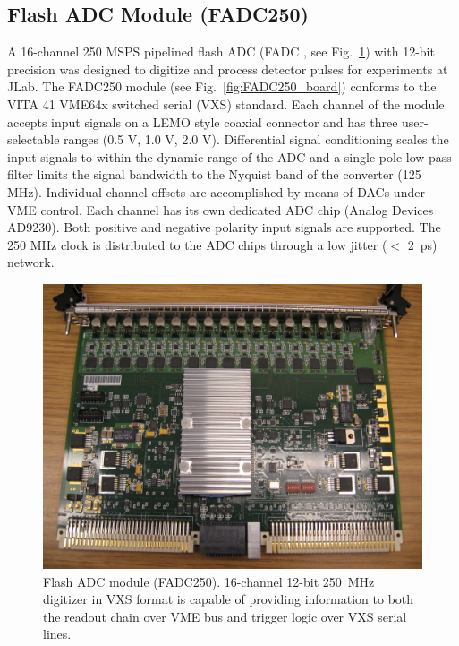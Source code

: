 \subsection{Flash ADC Module (FADC250)}

A 16-channel 250 MSPS pipelined flash ADC (FADC \cite{fadc-ref}, see Fig.~\ref{fig:FADC250pic}) with 12-bit precision was designed to digitize and process detector pulses for experiments at JLab.  The FADC250 module (see Fig.~\ref{fig:FADC250_board}) conforms to the VITA 41 VME64x switched serial (VXS) standard.  Each channel of the module accepts input signals on a LEMO style coaxial connector and has three user-selectable ranges (0.5 V, 1.0 V, 2.0 V).  Differential signal conditioning scales the input signals to within the dynamic range of the ADC and a single-pole low pass filter limits the signal bandwidth to the Nyquist band of the converter (125 MHz). Individual channel offsets are accomplished by means of DACs under VME control.  Each channel has its own dedicated ADC chip (Analog Devices AD9230). Both positive and negative polarity input signals are supported. The 250 MHz clock is distributed to the ADC chips through a low jitter ($<$ 2~ps) network.  

\begin{figure}[hbt]
	\centering
	\includegraphics[width=1.0\columnwidth,keepaspectratio]{img/FADC250pic.jpg}
	\caption{Flash ADC module (FADC250). 16-channel 12-bit 250~MHz digitizer in VXS format is capable of providing information to both the readout chain over VME bus and trigger logic over VXS serial lines.}
	\label{fig:FADC250pic}
\end{figure}

